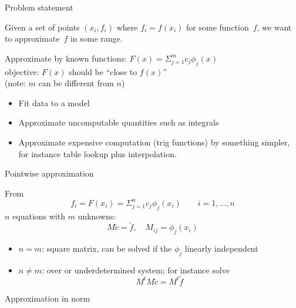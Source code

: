 
 {Problem statement} 

  Given a set of points $(x_i,f_i)$ where $f_i=f(x_i)$ for some
  function~$f$, we want to approximate~$f$ in some range.

  Approximate by known functions: $F(x)=\Sigma_{j=1}^mc_j\phi_j(x)$\\
  objective: $F(x)$ should be ``close to $f(x)$''\\
  (note: $m$ can be different from $n$)

  \begin{itemize}
  \item Fit data to a model
  \item Approximate uncomputable quantities such as integrals
  \item Approximate expensive computation (trig functions) by
    something simpler, for instance table lookup plus interpolation.
  \end{itemize}

 {Pointwise approximation}

  From \[ f_i=F(x_i)=\Sigma_{j=1}^nc_j\phi_j(x_i) \qquad i=1,\ldots,n \]
  $n$ equations with $m$ unknowns:
  \[ M \utilde c = \utilde f,\quad M_{ij}=\phi_j(x_i) \]

  \begin{itemize}
  \item $n=m$: square matrix, can be solved if the $\phi_j$ linearly independent
  \item $n\not=m$: over or underdetermined system; for instance solve
    \[ M^tM \utilde c = M^t \utilde f \]
  \end{itemize}

 {Approximation in norm}

